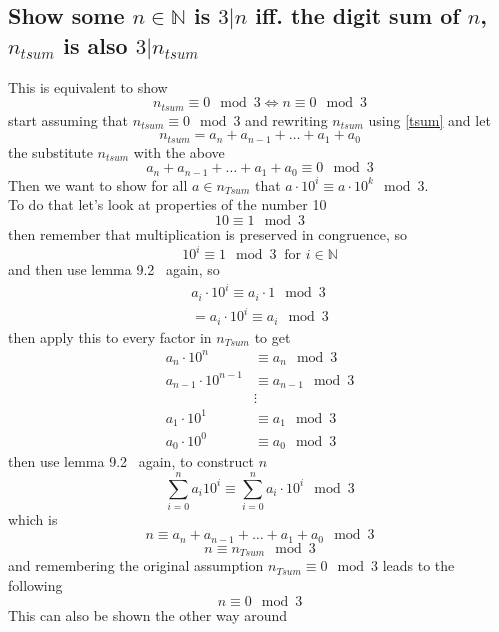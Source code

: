 \documentclass[12pt]{article}
\begin{document}
\subsection*{Show some $n \in \mathbb{N}$ is $3|n$ iff. the digit sum of $n$, $n_{tsum}$ is also $3|n_{tsum}$}
This is equivalent to show
\[
n_{tsum} \equiv 0 \mod 3 \Leftrightarrow n \equiv 0 \mod 3
\]
start assuming that $n_{tsum} \equiv 0 \mod 3$ and rewriting $n_{tsum}$ using \eqref{tsum} and let
\begin{equation}
    n_{tsum} = a_n + a_{n-1} + \hdots + a_1+ a_0 
\end{equation}
the substitute $n_{tsum}$ with the above
\begin{equation}
    a_n + a_{n-1} + \hdots + a_1+ a_0 \equiv 0 \mod 3
\end{equation}
Then we want to show for all $a \in n_{Tsum}$ that $a\cdot 10^i \equiv a\cdot 10^k \mod 3$.\\
To do that let's look at properties of the number 10
\begin{equation*}
    10 \equiv 1 \mod 3
\end{equation*}
then remember that multiplication is preserved in congruence, so
\begin{equation*}
    10^i \equiv 1 \mod 3 \;\; \text{for } i\in\mathbb{N}
\end{equation*}
and then use lemma 9.2~\cite{Algebra} again, so
\begin{align*}
    a_i \cdot 10^i \equiv a_i \cdot 1 \mod 3\\
    =  a_i \cdot 10^i \equiv a_i \mod 3
\end{align*}
then apply this to every factor in $n_{Tsum}$ to get
\begin{align*}
    a_n\cdot 10^n &\equiv a_n \mod 3\\
    a_{n-1}\cdot10^{n-1} &\equiv a_{n-1} \mod 3\\
    &\vdots\\
    a_1 \cdot 10^1 &\equiv a_1 \mod 3\\
    a_0 \cdot 10^0 &\equiv a_0 \mod 3
\end{align*}
then use lemma 9.2~\cite{Algebra} again, to construct $n$
\begin{equation*}
    \sum_{i=0}^{n}a_i10^i \equiv \sum_{i=0}^{n}a_i\cdot 10^i \mod 3
\end{equation*}
which is
\begin{equation*}
    n \equiv a_n + a_{n-1} + \hdots + a_1+ a_0 \mod 3
\end{equation*}
\begin{equation*}
    n \equiv n_{Tsum} \mod 3
\end{equation*}
and remembering the original assumption $n_{Tsum} \equiv 0 \mod 3$ leads to the following
\begin{equation}
    n \equiv 0 \mod 3
\end{equation}
This can also be shown the other way around
\end{document}
